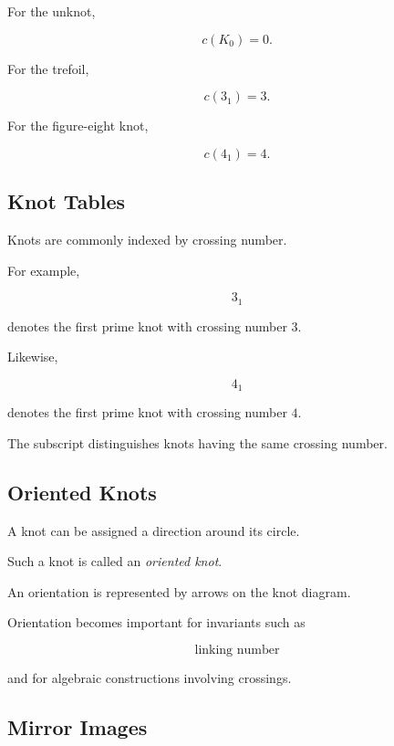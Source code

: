 For the unknot,

\[
\boxed{
c(K_0)=0.
}
\]

For the trefoil,

\[
\boxed{
c(3_1)=3.
}
\]

For the figure-eight knot,

\[
\boxed{
c(4_1)=4.
}
\]

\subsection{Knot Tables}
\label{subsec:knot-tables}

Knots are commonly indexed by crossing number.

For example,

\[
3_1
\]

denotes the first prime knot with crossing number \(3\).

Likewise,

\[
4_1
\]

denotes the first prime knot with crossing number \(4\).

The subscript distinguishes knots having the same crossing number.

\subsection{Oriented Knots}
\label{subsec:oriented-knots}

A knot can be assigned a direction around its circle.

Such a knot is called an \emph{oriented knot}.

An orientation is represented by arrows on the knot diagram.

Orientation becomes important for invariants such as

\[
\boxed{
\text{linking number}
}
\]

and for algebraic constructions involving crossings.

\subsection{Mirror Images}
\label{subsec:knot-mirror-images}

